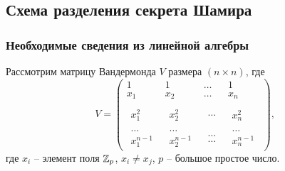 \subsection[Схема Шамира]{Схема разделения секрета Шамира}


\subsubsection{Необходимые сведения из линейной алгебры}

Рассмотрим матрицу Вандермонда $V$ размера $(n \times n)$, где
\[
    V = \left(\begin{array}{cccc}
        {1} & {1} & { \ldots } & {1} \\
        {x_{1} } & {x_{2} } & { \ldots } & {x_{n} } \\
        {\begin{array}{l} {} \\ {x_{1}^{2} } \end{array}} &
            {\begin{array}{l} {} \\ {x_{2}^{2} } \end{array}} &
            {\begin{array}{l} {} \\ { \ldots } \end{array}} &
            {\begin{array}{l} {} \\ {x_{n}^{2} } \end{array}} \\
        {\begin{array}{l} { \ldots } \\ {x_{1}^{n-1} } \end{array}} &
            {\begin{array}{l} { \ldots } \\ {x_{2}^{n-1} } \end{array}} &
            {\begin{array}{l} { \ldots } \\ { \ldots } \end{array}} &
            {\begin{array}{l} { \ldots } \\ {x_{n}^{n-1} } \end{array}}
    \end{array}\right),
\]
где $x_{i}$ -- элемент поля $\mathbb{Z}_{p}$, $x_{i} \ne x_{j}$, $p$ -- большое простое число.

